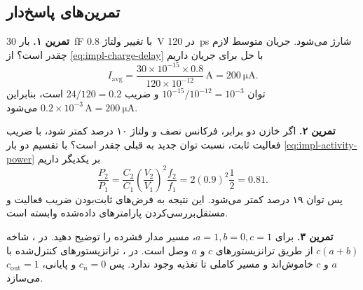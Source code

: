 \subsection{تمرین‌های پاسخ‌دار }
\textbf{تمرین ۱.} بار \qty{30}{\femto\farad} با تغییر ولتاژ \qty{0.8}{\volt}
در \qty{120}{\pico\second} شارژ می‌شود. جریان متوسط لازم چقدر است؟
از \eqref{eq:impl-charge-delay} با حل برای جریان داریم
\[
 I_{\mathrm{avg}}=\frac{30\times10^{-15}\times0.8}{120\times10^{-12}}
 \,\unit{\ampere}=\qty{200}{\micro\ampere}.
\]
توان \(10^{-15}/10^{-12}=10^{-3}\) و ضریب \(24/120=0.2\) است، بنابراین
\(0.2\times10^{-3}\,\unit{\ampere}=\qty{200}{\micro\ampere}\) می‌شود.

\textbf{تمرین ۲.} اگر خازن دو برابر، فرکانس نصف و ولتاژ ۱۰ درصد کمتر شود، با
ضریب فعالیت ثابت، نسبت توان جدید به قبلی چقدر است؟ با تقسیم دو بار
\eqref{eq:impl-activity-power} بر یکدیگر داریم
\[
 \frac{P_2}{P_1}=\frac{C_2}{C_1}
 \left(\frac{V_2}{V_1}\right)^2\frac{f_2}{f_1}
 =2(0.9)^2\frac12=0.81.
\]
پس توان ۱۹ درصد کمتر می‌شود. این نتیجه به فرض‌های ثابت‌بودن ضریب فعالیت و
مستقل‌بررسی‌کردن پارامترهای داده‌شده وابسته است.

\textbf{تمرین ۳.} برای \(a=1,b=0,c=1\)، مسیر مدار فشرده را توضیح دهید.
در ، شاخه \(c(a+b)\) از طریق ترانزیستورهای \(c\) و \(a\) وصل است.
در ، ترانزیستورهای کنترل‌شده با \(a\) و \(c\) خاموش‌اند و مسیر کاملی
تا تغذیه وجود ندارد. پس \(c_n=0\) و  پایانی، \(c_{\mathrm{out}}=1\) می‌سازد.
\clearpage
